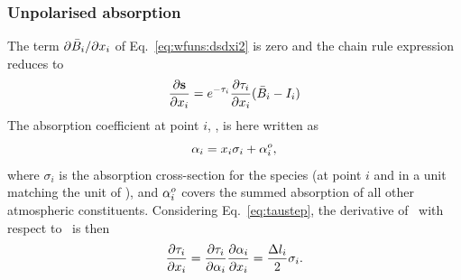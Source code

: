 \subsubsection{Unpolarised absorption}
%

The term $\partial\bar{B}_i/\partial x_{i}$ of Eq.~\ref{eq:wfuns:dsdxi2}
is zero and the chain rule expression reduces to
\begin{equation}
  \frac{\partial{\bf s}}{\partial x_{i}} =
   e^{-\tau_{i}}\frac{\partial\tau_{i}}{\partial x_{i}}
      (\bar{B}_i-I_{i})  
\end{equation}
The absorption coefficient at point $i$, , is here written as
\begin{equation}
  \label{eq:wfuns:crossec1}
  {\alpha}_{i} = x_{i}\sigma_i + {\alpha}_{i}^o,
\end{equation}
where $\sigma_i$ is the absorption cross-section for the species (at point $i$
and in a unit matching the unit of \SttElm), and ${\alpha}_{i}^o$ covers the
summed absorption of all other atmospheric constituents. Considering
Eq.~\ref{eq:taustep}, the derivative of \ with respect to \
is then 
\begin{equation}
  \frac{\partial\tau_{i}}{\partial x_{i}} = 
  \frac{\partial\tau_{i}}{\partial{\alpha}_{i}} 
  \frac{\partial{\alpha}_{i}}{\partial x_{i}} = 
    \frac{\Delta l_{i}}{2}\sigma_i.
\end{equation}

%


